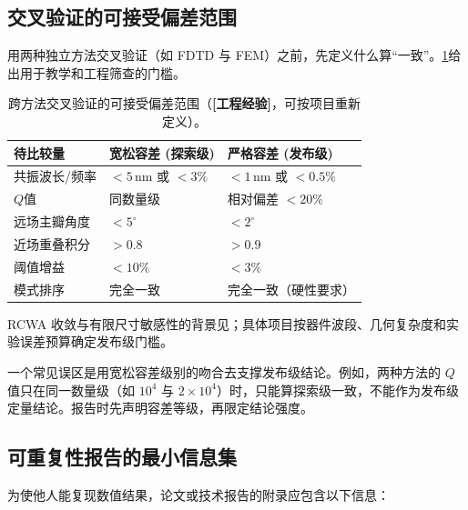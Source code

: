 \subsection{交叉验证的可接受偏差范围}
用两种独立方法交叉验证（如 FDTD 与 FEM）之前，先定义什么算“一致”。\cref{tab:xval-tolerance}给出用于教学和工程筛查的门槛。

\begin{table}[htbp]
  \centering
  \footnotesize
  \caption{跨方法交叉验证的可接受偏差范围（\textbf{[工程经验]}，可按项目重新定义）。}
  \label{tab:xval-tolerance}
  \setlength{\tabcolsep}{3pt}
  \begin{tabularx}{\textwidth}{@{}p{2.8cm}p{3.2cm}X@{}}
    \toprule
    待比较量 & 宽松容差 (探索级) & 严格容差 (发布级) \\
    \midrule
    共振波长/频率 & $< 5\,$nm 或 $< 3\%$ & $< 1\,$nm 或 $< 0.5\%$ \\
    $Q$值 & 同数量级 & 相对偏差 $< 20\%$ \\
    远场主瓣角度 & $< 5^\circ$ & $< 2^\circ$ \\
    近场重叠积分 & $> 0.8$ & $> 0.9$ \\
    阈值增益 & $< 10\%$ & $< 3\%$ \\
    模式排序 & 完全一致 & 完全一致（硬性要求） \\
    \bottomrule
  \end{tabularx}
\end{table}

RCWA 收敛与有限尺寸敏感性的背景见\cite{li1996,moharam1995stablercwa,wang2025finitesizepcsel}；具体项目按器件波段、几何复杂度和实验误差预算确定发布级门槛。

\begin{WhatCouldGoWrong}
一个常见误区是用宽松容差级别的吻合去支撑发布级结论。例如，两种方法的 $Q$ 值只在同一数量级（如 $10^4$ 与 $2\times10^4$）时，只能算探索级一致，不能作为发布级定量结论。报告时先声明容差等级，再限定结论强度。
\end{WhatCouldGoWrong}

\subsection{可重复性报告的最小信息集}
为使他人能复现数值结果，论文或技术报告的附录应包含以下信息：

